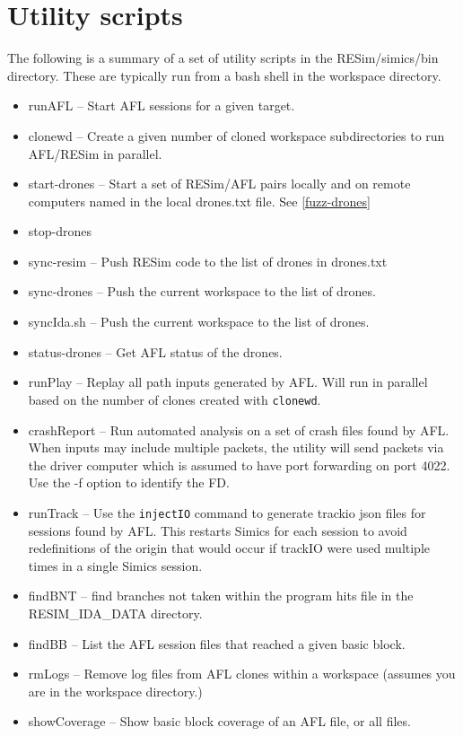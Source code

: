 \documentclass[titlepage]{article}
\begin{document}
\section{Utility scripts}
\label{utilities}
The following is a summary of a set of utility scripts in the RESim/simics/bin directory.
These are typically run from a bash shell in the workspace directory.
\begin{itemize}
\item runAFL -- Start AFL sessions for a given target.
\item clonewd -- Create a given number of cloned workspace subdirectories to run AFL/RESim in parallel.
\item start-drones -- Start a set of RESim/AFL pairs locally and on remote computers named in the local drones.txt file. See \ref{fuzz-drones}
\item stop-drones
\item sync-resim -- Push RESim code to the list of drones in drones.txt
\item sync-drones -- Push the current workspace to the list of drones.
\item syncIda.sh -- Push the current workspace to the list of drones.
\item status-drones -- Get AFL status of the drones.
\item runPlay -- Replay all path inputs generated by AFL.  Will run in parallel based on the number of clones created with {\tt clonewd}.
\item crashReport -- Run automated analysis on a set of crash files found by AFL.  When inputs may include multiple packets, the utility
will send packets via the driver computer which is assumed to have port forwarding on port 4022.   Use the -f option
to identify the FD.
\item runTrack -- Use the {\tt injectIO} command to generate trackio json files for sessions found by AFL. This restarts Simics for each session
to avoid redefinitions of the origin that would occur if trackIO were used multiple times in a single Simics session.
\item findBNT -- find branches not taken within the program hits file in the RESIM\_IDA\_DATA directory.
\item findBB -- List the AFL session files that reached a given basic block.
\item rmLogs -- Remove log files from AFL clones within a workspace (assumes you are in the workspace directory.)
\item showCoverage -- Show basic block coverage of an AFL file, or all files.

\end{itemize}
\end{document}
